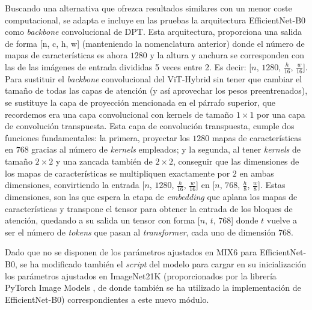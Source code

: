 Buscando una alternativa que ofrezca resultados similares con un menor coste computacional, se adapta e incluye en las pruebas la arquitectura EfficientNet-B0 como \textit{backbone} convolucional de DPT. Esta arquitectura, proporciona una salida de forma [n, c, h, w] (manteniendo la nomenclatura anterior) donde el número de mapas de características es ahora $1280$ y la altura y anchura se corresponden con las de las imágenes de entrada divididas 5 veces entre 2. Es decir: [$n$, $1280$, $\frac{h}{16}$, $\frac{w}{16}$]. Para sustituir el \textit{backbone} convolucional del ViT-Hybrid sin tener que cambiar el tamaño de todas las capas de atención (y así aprovechar los pesos preentrenados), se sustituye la capa de proyección mencionada en el párrafo superior, que recordemos era una capa convolucional con kernels de tamaño $1\times1$ por una capa de convolución transpuesta. Esta capa de convolución transpuesta, cumple dos funciones fundamentales: la primera, proyectar los $1280$ mapas de características en $768$ gracias al número de \textit{kernels} empleados; y la segunda, al tener \textit{kernels} de tamaño $2\times2$ y una zancada también de $2\times2$, conseguir que las dimensiones de los mapas de características se multipliquen exactamente por $2$ en ambas dimensiones, convirtiendo la entrada [$n$, $1280$, $\frac{h}{16}$, $\frac{w}{16}$] en [$n$, $768$, $\frac{h}{8}$, $\frac{w}{8}$]. Estas dimensiones, son las que espera la etapa de \textit{embedding} que aplana los mapas de características y transpone el tensor para obtener la entrada de los bloques de atención, quedando a su salida un tensor con forma [$n$, $t$, $768$] donde $t$ vuelve a ser el número de \textit{tokens} que pasan al \textit{transformer}, cada uno de dimensión $768$.

Dado que no se disponen de los parámetros ajustados en MIX6 para EfficientNet-B0, se ha modificado también el \textit{script} del modelo para cargar en su inicialización los parámetros ajustados en ImageNet21K (proporcionados por la librería PyTorch Image Models \cite{timm}, de donde también se ha utilizado la implementación de EfficientNet-B0) correspondientes a este nuevo módulo. 




\clearpage